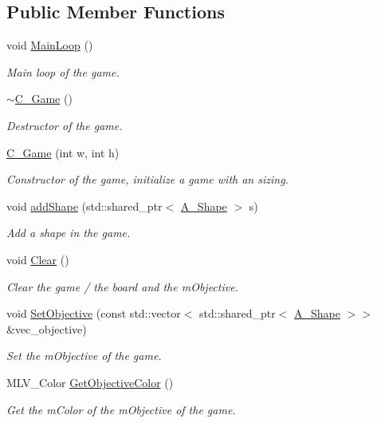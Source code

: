\subsection*{Public Member Functions}
\begin{DoxyCompactItemize}
\item 
void \hyperlink{classC__Game_aa15149075c2a4bd4704235d83c1c4f20}{Main\+Loop} ()
\begin{DoxyCompactList}\small\item\em Main loop of the game. \end{DoxyCompactList}\item 
\hyperlink{classC__Game_a4a11981e90a66634568f59ac823a697e}{$\sim$\+C\+\_\+\+Game} ()
\begin{DoxyCompactList}\small\item\em Destructor of the game. \end{DoxyCompactList}\item 
\hyperlink{classC__Game_ac5a1aba1deb606a281d3992459566716}{C\+\_\+\+Game} (int w, int h)
\begin{DoxyCompactList}\small\item\em Constructor of the game, initialize a game with an sizing. \end{DoxyCompactList}\item 
void \hyperlink{classC__Game_ad2b7512192879ec7cd76d4eed4fef938}{add\+Shape} (std\+::shared\+\_\+ptr$<$ \hyperlink{classA__Shape}{A\+\_\+\+Shape} $>$ s)
\begin{DoxyCompactList}\small\item\em Add a shape in the game. \end{DoxyCompactList}\item 
void \hyperlink{classC__Game_a1ad2e168bba0305e48c0bf8e162a889a}{Clear} ()
\begin{DoxyCompactList}\small\item\em Clear the game / the board and the m\+Objective. \end{DoxyCompactList}\item 
void \hyperlink{classC__Game_a0fa57725991fb2b249eb40dd776a68c4}{Set\+Objective} (const std\+::vector$<$ std\+::shared\+\_\+ptr$<$ \hyperlink{classA__Shape}{A\+\_\+\+Shape} $>$$>$ \&vec\+\_\+objective)
\begin{DoxyCompactList}\small\item\em Set the m\+Objective of the game. \end{DoxyCompactList}\item 
M\+L\+V\+\_\+\+Color \hyperlink{classC__Game_a0efbb25a7daf4411b2dfe3055530ac85}{Get\+Objective\+Color} ()
\begin{DoxyCompactList}\small\item\em Get the m\+Color of the m\+Objective of the game. \end{DoxyCompactList}\end{DoxyCompactItemize}


